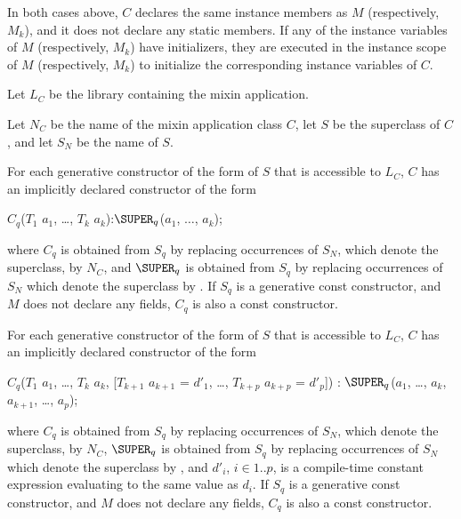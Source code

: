 \documentclass{article}
\begin{document}
\LMHash{}
In both cases above, $C$ declares the same instance members as $M$ (respectively, $M_k$),
and it does not declare any static members.
If any of the instance variables of $M$ (respectively, $M_k$) have initializers,
they are executed in the instance scope of $M$ (respectively, $M_k$)
to initialize the corresponding instance variables of $C$.

\LMHash{}
Let $L_C$ be the library containing the mixin application.

Let $N_C$ be the name of the mixin application class $C$,
let $S$ be the superclass of $C$, and let $S_N$ be the name of $S$.

For each generative constructor of the form  of $S$ that is accessible to $L_C$, $C$ has an implicitly declared constructor of the form
\begin{dartCode}
$C_q$($T_{1}$ $a_{1}$, \ldots, $T_{k}$ $a_{k}$):$\SUPER_q$($a_{1}$, $\ldots$, $a_{k}$);
\end{dartCode}

\noindent
where $C_q$ is obtained from $S_q$ by replacing occurrences of $S_N$,
which denote the superclass, by $N_C$, and $\SUPER_q$ is obtained from $S_q$ by
replacing occurrences of $S_N$ which denote the superclass by \SUPER{}.
If $S_q$ is a generative const constructor, and $M$ does not declare any
fields, $C_q$ is also a const constructor.

\LMHash{}
For each generative constructor of the form  of $S$ that is accessible to $L_C$, $C$ has an implicitly declared constructor of the form
\begin{dartCode}
$C_q$($T_{1}$ $a_{1}$, \ldots , $T_{k}$ $a_{k}$, [$T_{k+1}$ $a_{k+1}$ = $d'_{1}$, \ldots , $T_{k+p}$ $a_{k+p}$ = $d'_p$])
    : $\SUPER_q$($a_{1}$, \ldots , $a_{k}$, $a_{k+1}$, \ldots, $a_p$);
\end{dartCode}

\noindent
where $C_q$ is obtained from $S_q$ by replacing occurrences of $S_N$,
which denote the superclass, by $N_C$,
$\SUPER_q$ is obtained from $S_q$ by replacing occurrences of $S_N$
which denote the superclass by \SUPER{},
and $d'_i$, $i \in 1..p$, is a compile-time constant expression evaluating
to the same value as $d_i$.
If $S_q$ is a generative const constructor, and $M$ does not declare any
fields, $C_q$ is also a const constructor.
\end{document}
